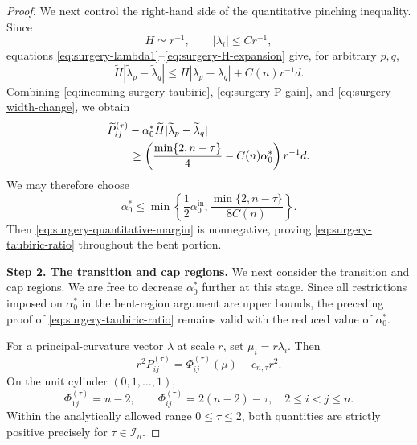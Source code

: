 \documentclass[11pt,reqno]{amsart}
\theoremstyle{definition}
\theoremstyle{remark}
\numberwithin{equation}{section}
\begin{document}
\begin{proof}
  We next control the right-hand side of the quantitative pinching
  inequality.  Since
  \begin{equation*}
  H\simeq r^{-1},
  \qquad
  |\lambda_i|\leq Cr^{-1},
  \end{equation*}
  equations
  \eqref{eq:surgery-lambda1}--\eqref{eq:surgery-H-expansion} give, for
  arbitrary $p,q$,
  \begin{equation}\label{eq:surgery-width-change}
    \widetilde H
    |\widetilde\lambda_p-\widetilde\lambda_q|
    \leq
    H|\lambda_p-\lambda_q|
    +C(n)r^{-1}d.
  \end{equation}
  Combining
  \eqref{eq:incoming-surgery-taubiric},
  \eqref{eq:surgery-P-gain}, and
  \eqref{eq:surgery-width-change}, we obtain
  \begin{align}
    &\widetilde P_{ij}^{(\tau)}
    -\alpha_0^*\widetilde H
    |\widetilde\lambda_p-\widetilde\lambda_q|
    \notag\\
    &\qquad\geq
    \left(
    \frac{\min\{2,n-\tau\}}4-C(n)\alpha_0^*
    \right)r^{-1}d.
    \label{eq:surgery-quantitative-margin}
  \end{align}
  We may therefore choose
  \begin{equation}\label{eq:surgery-alpha-star-choice}
    \alpha_0^*
    \leq
    \min\left\{
    \frac12\alpha_0^{\mathrm{in}},
    \frac{\min\{2,n-\tau\}}{8C(n)}
    \right\}.
  \end{equation}
  Then \eqref{eq:surgery-quantitative-margin} is nonnegative, proving
  \eqref{eq:surgery-taubiric-ratio} throughout the bent portion.

  \smallskip
\textbf{Step 2. The transition and cap regions.}
We next consider the transition and cap regions. We are free to decrease $\alpha_0^*$ further at this stage. Since all restrictions imposed on $\alpha_0^*$ in the bent-region argument are upper bounds, the preceding proof of \eqref{eq:surgery-taubiric-ratio} remains valid with the reduced value of $\alpha_0^*$.  

For a principal-curvature vector $\lambda$ at scale $r$, set
$\mu_i=r\lambda_i$. 
  Then
  \begin{equation}\label{eq:normalized-surgery-P}
    r^2P_{ij}^{(\tau)}
    =
    \Phi_{ij}^{(\tau)}(\mu)-c_{n,\tau}r^2.
  \end{equation}
  On the unit cylinder $(0,1,\ldots,1)$,
  \begin{equation}\label{eq:surgery-cylinder-Phi}
    \Phi_{1j}^{(\tau)}=n-2,
    \qquad
    \Phi_{ij}^{(\tau)}
    =2(n-2)-\tau,
    \quad 2\leq i<j\leq n.
  \end{equation}
  Within the analytically allowed range $0\leq\tau\leq2$, both quantities are
  strictly positive precisely for $\tau\in\mathcal I_n$.


\end{proof}
\end{document}

